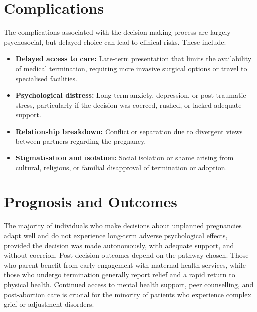 \section*{Complications}
The complications associated with the decision-making process are largely psychosocial, but delayed choice can lead to clinical risks. These include:
\begin{itemize}
    \item \textbf{Delayed access to care:} Late-term presentation that limits the availability of medical termination, requiring more invasive surgical options or travel to specialised facilities.
    \item \textbf{Psychological distress:} Long-term anxiety, depression, or post-traumatic stress, particularly if the decision was coerced, rushed, or lacked adequate support.
    \item \textbf{Relationship breakdown:} Conflict or separation due to divergent views between partners regarding the pregnancy.
    \item \textbf{Stigmatisation and isolation:} Social isolation or shame arising from cultural, religious, or familial disapproval of termination or adoption.
\end{itemize}

\section*{Prognosis and Outcomes}
The majority of individuals who make decisions about unplanned pregnancies adapt well and do not experience long-term adverse psychological effects, provided the decision was made autonomously, with adequate support, and without coercion. Post-decision outcomes depend on the pathway chosen. Those who parent benefit from early engagement with maternal health services, while those who undergo termination generally report relief and a rapid return to physical health. Continued access to mental health support, peer counselling, and post-abortion care is crucial for the minority of patients who experience complex grief or adjustment disorders.

